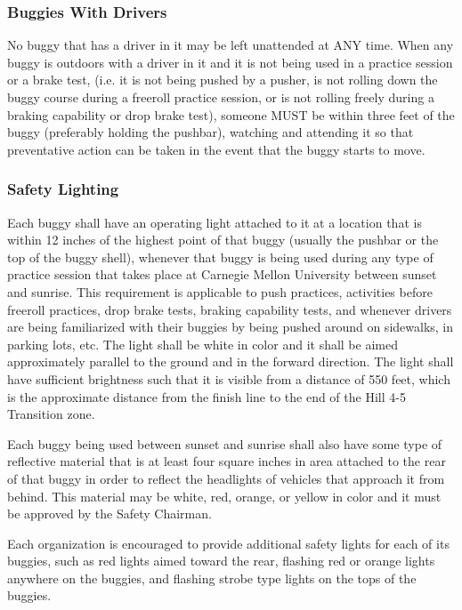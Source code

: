 \subsubsection{Buggies With Drivers}

	No buggy that has a driver in it may be left unattended at ANY time. When any
	buggy is outdoors with a driver in it and it is not being used in a practice
	session or a brake test, (i.e. it is not being pushed by a pusher, is not
	rolling down the buggy course during a freeroll practice session, or is not
	rolling freely during a braking capability or drop brake test), someone MUST be
	within three feet of the buggy (preferably holding the pushbar), watching and
	attending it so that preventative action can be taken in the event that the
	buggy starts to move.

\subsubsection{Safety Lighting}

	Each buggy shall have an operating light attached to it at a location that is
	within 12 inches of the highest point of that buggy (usually the pushbar or the
	top of the buggy shell), whenever that buggy is being used during any type of
	practice session that takes place at Carnegie Mellon University between sunset
	and sunrise. This requirement is applicable to push practices, activities
	before freeroll practices, drop brake tests, braking capability tests, and
	whenever drivers are being familiarized with their buggies by being pushed
	around on sidewalks, in parking lots, etc. The light shall be white in color
	and it shall be aimed approximately parallel to the ground and in the forward
	direction. The light shall have sufficient brightness such that it is visible
	from a distance of 550 feet, which is the approximate distance from the finish
	line to the end of the Hill 4-5 Transition zone.

	Each buggy being used between sunset and sunrise shall also have some type of
	reflective material that is at least four square inches in area attached to the
	rear of that buggy in order to reflect the headlights of vehicles that approach
	it from behind. This material may be white, red, orange, or yellow in color and
	it must be approved by the Safety Chairman.

	Each organization is encouraged to provide additional safety lights for each of
	its buggies, such as red lights aimed toward the rear, flashing red or orange
	lights anywhere on the buggies, and flashing strobe type lights on the tops of
	the buggies.

